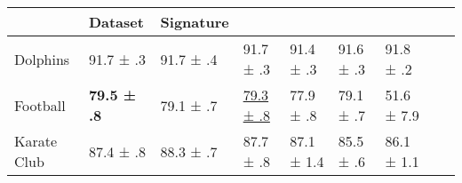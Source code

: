 \begin{tabular}{lllllll}
\toprule
& Dataset & Signature &  &  &  
&  &  & \\
\midrule
Dolphins & 91.7 ± .3 & 91.7 ± .4 & 91.7 ± .3 & 91.4 ± .3 & 91.6 ± .3 & 91.8 ± .2 \\
Football & \textbf{79.5 ± .8} & 79.1 ± .7 & \underline{79.3 ± .8} & 77.9 ± .8 & 79.1 ± .7 & 51.6 ± 7.9 \\
Karate Club & 87.4 ± .8 & 88.3 ± .7 & 87.7 ± .8 & 87.1 ± 1.4 & 85.5 ± .6 & 86.1 ± 1.1 \\
\bottomrule
\end{tabular}
